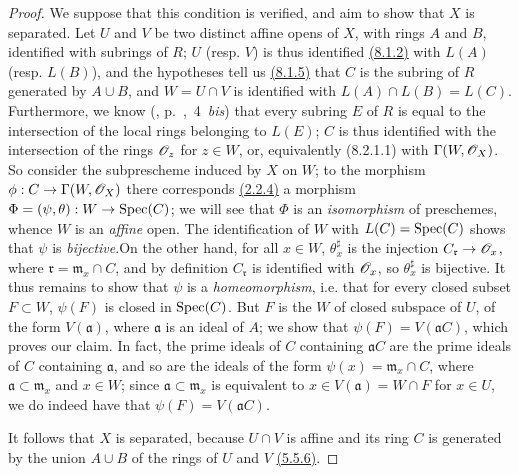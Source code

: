 \begin{proof}
\label{proof-prop-1.8.2.2}
We suppose that this condition is verified, and aim to show that $X$ is separated.
Let $U$ and $V$ be two distinct affine opens of $X$, with rings $A$ and $B$,
identified with subrings of $R$; $U$ (resp. $V$) is thus identified \hyperref[env-1.8.1.2]{(8.1.2)}
with $L(A)$ (resp. $L(B)$), and the hypotheses tell us \hyperref[env-1.8.1.5]{(8.1.5)} that $C$ is
the subring of $R$ generated by $A\cup B$, and $W=U\cap V$ is identified with
$L(A)\cap L(B)=L(C)$. Furthermore, we know
(\cite{I-1}, p.~,~4~{\em bis}) that every subring $E$ of $R$ is
equal to the intersection of the local rings belonging to $L(E)$; $C$ is thus
identified with the intersection of the rings $\mathscr{O}_z$ for $z\in W$, or,
equivalently (8.2.1.1) with $\Gamma(W,\mathscr{O}_X)$. So consider the subprescheme
induced by $X$ on $W$; to the  morphism $\phi:
C\to\Gamma(W,\mathscr{O}_X)$ there corresponds \hyperref[prop-1.2.2.4]{(2.2.4)} a morphism
$\Phi=(\psi,\theta):W\to{\mathop{\mathrm{Spec}}\nolimits}(C)$; we will see that $\Phi$ is an
{\em isomorphism} of preschemes, whence $W$ is an {\em affine} open. The
identification of $W$ with $L(C)={\mathop{\mathrm{Spec}}\nolimits}(C)$ shows that $\psi$ is
{\em bijective}.On the other hand, for all $x\in W$, $\theta_x^\sharp$ is the
injection $C_\mathfrak{r}\to\mathscr{O}_x$, where $\mathfrak{r}=\mathfrak{m}_x\cap C$,
and by definition $C_\mathfrak{r}$ is identified with $\mathscr{O}_x$, so $\theta_x^\sharp$
is bijective. It thus remains to show that $\psi$ is a {\em homeomorphism},
i.e. that for every closed subset $F\subset W$, $\psi(F)$ is closed in
${\mathop{\mathrm{Spec}}\nolimits}(C)$. But $F$ is the  $W$ of closed subspace of $U$,
of the form $V(\mathfrak{a})$, where $\mathfrak{a}$ is an ideal of $A$; we show
that $\psi(F)=V(\mathfrak{a}C)$, which proves our claim. In fact, the prime
ideals of $C$ containing $\mathfrak{a}C$ are the prime ideals of $C$ containing
$\mathfrak{a}$, and so are the ideals of the form $\psi(x)=\mathfrak{m}_x\cap
C$, where $\mathfrak{a}\subset\mathfrak{m}_x$ and $x\in W$; since
$\mathfrak{a}\subset\mathfrak{m}_x$ is equivalent to $x\in V(\mathfrak{a})=W\cap
F$ for $x\in U$, we do indeed have that $\psi(F)=V(\mathfrak{a}C)$.

It follows that $X$ is separated, because $U\cap V$ is affine and its ring $C$
is generated by the union $A\cup B$ of the rings of $U$ and $V$ \hyperref[env-1.5.5.6]{(5.5.6)}.


\end{proof}
